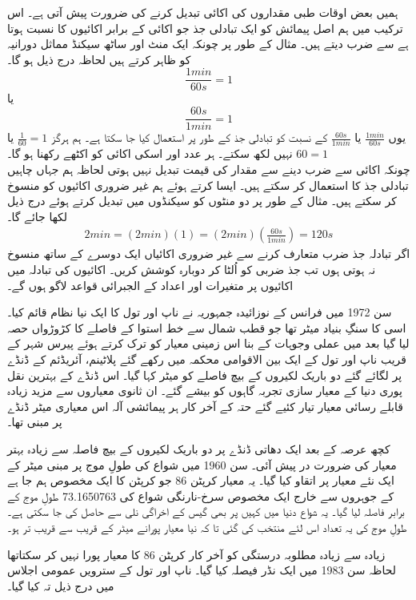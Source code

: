 	ہمیں بعض اوقات طبی مقداروں کی اکائی تبدیل کرنے کی ضرورت پیش آتی ہے۔ اس ترکیب میں ہم اصل پیمائش کو ایک تبادلی جذ جو اکائی کے برابر اکائیوں کا نسبت ہوتا ہے سے ضرب دیتے ہیں۔ مثال کے طور پر چونکہ ایک منٹ اور ساٹھ سیکنڈ مماثل دورانیہ کو ظاہر کرتے ہیں لحاظہ درج ذیل ہو گا۔
	\[\frac{1 min}{60 s} = 1\]
	یا
	\[\frac{60 s}{1 min} = 1\]
	یوں \(\frac{1 min}{60 s}\) یا \(\frac{60 s}{1 min}\) کے نسبت کو تبادلی جذ کے طور پر استعمال کیا جا سکتا ہے۔ ہم ہرگز \(\frac{1}{60}=1\) یا \(60 = 1\) نہیں لکھ سکتے۔ ہر عدد اور اسکی اکائی کو اکٹھے رکھنا ہو گا۔\\چونکہ اکائی سے ضرب دینے سے مقدار کی قیمت تبدیل نہیں ہوتی لحاظہ ہم جہاں چاہیں تبادلی جذ کا استعمال کر سکتے ہیں۔ ایسا کرتے ہوئے ہم غیر ضروری اکائیوں کو منسوخ کر سکتے ہیں۔ مثال کے طور پر دو منٹوں کو سیکنڈوں میں تبدیل کرتے ہوئے درج ذیل لکھا جائے گا۔
	\begin{align}
		2 min = (2 min)(1) = (2 min)(\frac{60 s}{1 min}) = 120 s
	\end{align}
	اگر تبادلہ جذ ضرب متعارف  کرنے سے غیر  ضروری  اکائیاں ایک دوسرے کے ساتھ منسوخ نہ ہوتی ہوں تب جذ ضربی کو اُلٹا کر دوبارہ کوشش کریں۔ اکائیوں کی تبادلہ میں اکائیوں پر متغیرات اور اعداد کے الجبرائی قواعد لاگو ہوں گے۔

	سن 1972 میں فرانس کے نوزائیدہ جمہوریہ نے ناپ اور تول کا ایک نیا نظام قائم کیا۔ اسی کا سنگِ بنیاد میٹر تھا جو قطب شمال سے خط استوا کے فاصلے کا کڑوڑواں حصہ لیا گیا بعد میں عملی وجوہات کے بنا اس زمینی معیار کو ترک کرتے ہوئے پیرس شہر کے قریب ناپ اور تول کے ایک بین الاقوامی محکمہ میں رکھے گئے پلاٹینم، آئریڈئم کے ڈنڈے پر لگائے گئے دو باریک لکیروں کے بیچ فاصلے کو میٹر کہا گیا۔ اس ڈنڈے کے بہترین نقل پوری دنیا کے معیار سازی تجربہ گاہوں کو بیشے گئے۔ ان ثانوی معیاروں سے مزید زیادہ قابلے رسائی معیار تیار کئیے گئے حتہ کے آخر کار ہر پیمائشی آلہ اس معیاری میٹر ڈنڈے پر مبنی تھا۔
	
	کچھ عرصہ کے بعد ایک دھاتی ڈنڈے پر دو باریک لکیروں کے بیچ فاصلہ سے زیادہ بہتر معیار کی ضرورت در پیش آئی۔ سن 1960 میں شواع کی طولِ موج پر مبنی میٹر کے ایک نئے معیار پر اتقاو کیا گیا۔ یہ معیار کرپٹن 86 جو کرپٹن کا ایک مخصوص ہم جا ہے کے جوہروں سے خارج ایک مخصوص سرخ-نارنگی شواع کی 73.1650763 طولِ موج کے برابر فاصلہ لیا گیا۔ یہ شواع دنیا میں کہیں پر بھی گیس کے اخراگی نلی سے حاصل کی جا سکتی ہے۔ طولِ موج کی یہ تعداد اس لئے منتخب کی گئی تا کہ نیا معیار پورانے میٹر کے قریب سے قریب تر ہو۔
	
	زیادہ سے زیادہ مطلوبہ درستگی کو آخر کار کرپٹن 86 کا معیار پورا نہیں کر سکتاتھا لحاظہ سن 1983 میں ایک نڈر فیصلہ کیا گیا۔ ناپ اور تول کے سترویں عمومی اجلاس میں درج ذیل تہ کیا گیا۔
	
